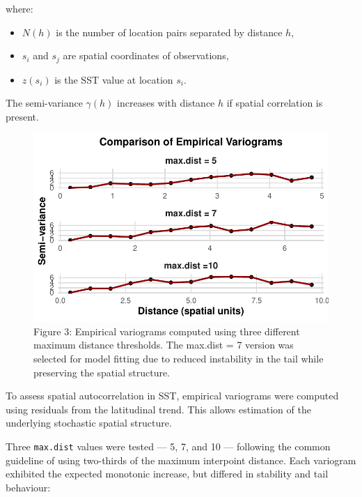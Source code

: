 \documentclass[
  11pt,
]{article}
\begin{document}
where:

\begin{itemize}
\item
  \(N(h)\) is the number of location pairs separated by distance \(h\),
\item
  \(s_i\) and \(s_j\) are spatial coordinates of observations,
\item
  \(z\)\((s_i)\) is the SST value at location \(s_i\)\hspace{0pt}.
\end{itemize}

The semi-variance \(\gamma(h)\) increases with distance \(h\) if spatial
correlation is present.

\begin{figure}[H]

{\centering \includegraphics{project_files/figure-pdf/fig-variogcompare-1.pdf}

}

\caption{Figure 3: Empirical variograms computed using three different
maximum distance thresholds. The max.dist = 7 version was selected for
model fitting due to reduced instability in the tail while preserving
the spatial structure.}

\end{figure}%

To assess spatial autocorrelation in SST, empirical variograms were
computed using residuals from the latitudinal trend. This allows
estimation of the underlying stochastic spatial structure.

Three \texttt{max.dist} values were tested --- 5, 7, and 10 ---
following the common guideline of using two-thirds of the maximum
interpoint distance. Each variogram exhibited the expected monotonic
increase, but differed in stability and tail behaviour:
\end{document}
